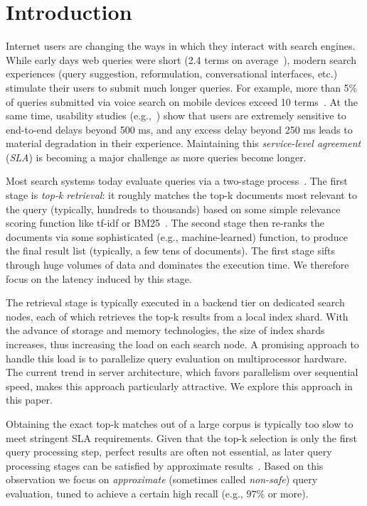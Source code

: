 \section{Introduction}
\label{sec:intro}

Internet users are changing the ways in which they interact with search engines. 
While  early days web queries were short (2.4 terms on average~\cite{Spink:2001:SWP:362968.362979}), 
modern search experiences (query suggestion, reformulation, conversational interfaces, etc.) stimulate their users to submit much longer queries. 
For example, more than 5\% of queries submitted via voice search on mobile devices exceed 10 terms~\cite{sigir/Guy16}. 
At the same time, usability studies
(e.g.,~\cite{Arapakis:2014:IRL:2600428.2609627}) show that users are extremely sensitive to end-to-end delays beyond 500 ms, 
and any excess delay beyond 250 ms leads to material degradation in their experience. Maintaining this \emph{service-level agreement} ({\em SLA}) 
is becoming a major challenge as more queries become longer.

 Most search systems today evaluate queries via a two-stage process~\cite{Wang:2011}. 
The first stage is \emph{top-k retrieval}: it 
 roughly matches the top-k documents most relevant to the query (typically, hundreds to thousands) based on some simple relevance scoring function like tf-idf or BM25~\cite{Baeza-Yates:1999:MIR:553876}. The second stage then re-ranks the  documents via some sophisticated (e.g., machine-learned) function, to produce the final result list (typically, a few tens of documents). 
The first stage  sifts through huge volumes of data and dominates the execution time. 
We therefore focus on the latency induced by this stage. 

The retrieval stage is typically executed in a backend  tier on dedicated search nodes, each of which retrieves the top-k results from a local index shard. 
With the advance of storage and memory technologies, the size of index shards increases, thus increasing the load on each search node. 
A promising approach to handle this load is to  parallelize query evaluation on multiprocessor hardware. 
The current trend in server architecture, which favors parallelism over sequential speed, makes this approach particularly attractive. 
We explore this approach in this paper.


Obtaining the exact top-k matches out of a large corpus is typically too slow to meet stringent SLA requirements. 
Given that the top-k selection is only the first query  processing step, perfect results are often not essential, as later query processing 
stages can be satisfied by approximate results~\cite{Lin:2015}. Based on this observation we focus on \emph{approximate} 
(sometimes called \emph{non-safe}) query evaluation, tuned to achieve a certain high recall (e.g., $97\%$ or more). 


